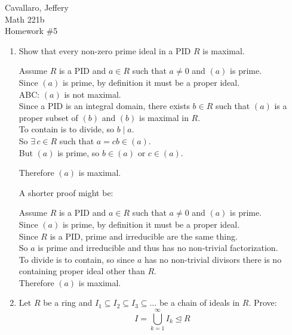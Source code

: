 \documentclass[letterpaper,12pt,fleqn]{article}
\newcommand{\ide}{\trianglelefteq}
\begin{document}
Cavallaro, Jeffery \\
Math 221b \\
Homework \#5

\bigskip

\begin{enumerate}
\item Show that every non-zero prime ideal in a PID $R$ is maximal.

  Assume $R$ is a PID and $a\in R$ such that $a\ne0$ and $(a)$ is prime. \\
  Since $(a)$ is prime, by definition it must be a proper ideal. \\
  ABC: $(a)$ is not maximal. \\
  Since a PID is an integral domain, there exists $b\in R$ such that $(a)$ is a
  proper subset of $(b)$ and $(b)$ is maximal in $R$. \\
  To contain is to divide, so $b\mid a$. \\
  So $\exists\,c\in R$ such that $a=cb\in(a)$. \\
  But $(a)$ is prime, so $b\in(a)$ or $c\in(a)$.
  Therefore $(a)$ is maximal.

  A shorter proof might be:

  Assume $R$ is a PID and $a\in R$ such that $a\ne0$ and $(a)$ is prime. \\
  Since $(a)$ is prime, by definition it must be a proper ideal. \\
  Since $R$ is a PID, prime and irreducible are the same thing. \\
  So $a$ is prime and irreducible and thus has no non-trivial factorization. \\
  To divide is to contain, so since $a$ has no non-trivial divisors there is
  no containing proper ideal other than $R$. \\
  Therefore $(a)$ is maximal.
\newpage  
\item Let $R$ be a ring and $I_1\subseteq I_2\subseteq I_3\subseteq\ldots$ be
  a chain of ideals in $R$. Prove:
  \[I=\bigcup_{k=1}^{\infty}I_k\ide R\]


\end{enumerate}
\end{document}
